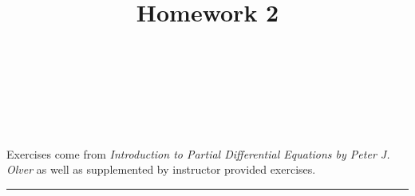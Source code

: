 \documentclass[10pt]{amsart}
\theoremstyle{nonumberplain}
\begin{document}
\pagestyle{empty}

\newcommand{\mline}{\vspace{.2in}\hrule\vspace{.2in}}

\noindent
{} \\
 \\
 \\
 \\

\title{\bf {Homework 2} }


\maketitle
\noindent
Exercises come from \textit{Introduction to Partial Differential Equations by Peter J. Olver} as well as supplemented by instructor provided exercises.
\mline
\end{document}
